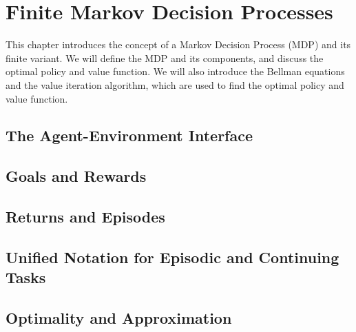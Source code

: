 \section{Finite Markov Decision Processes}

This chapter introduces the concept of a Markov Decision Process (MDP) and its finite variant. We will define the MDP and its components, and discuss the optimal policy and value function. We will also introduce the Bellman equations and the value iteration algorithm, which are used to find the optimal policy and value function.

\subsection{The Agent-Environment Interface}

\subsection{Goals and Rewards}

\subsection{Returns and Episodes}

\subsection{Unified Notation for Episodic and Continuing Tasks}

\subsection{Optimality and Approximation}